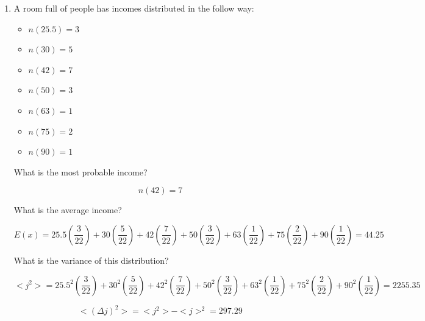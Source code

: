 \documentclass{article}
\begin{document}
\begin{enumerate}
\item A room full of people has incomes distributed in the follow way:

\begin{itemize}
\item $n(25.5) = 3$
\item $n(30) = 5$
\item $n(42) = 7$
\item $n(50) = 3$
\item $n(63) = 1$
\item $n(75) = 2$
\item $n(90) = 1$
\end{itemize}

What is the most probable income?

\[ n(42) = 7\]

What is the average income?

\[E(x) = 25.5 (\frac{3}{22})+ 30 (\frac{5}{22})+ 42 (\frac{7}{22})+ 50 (\frac{3}{22})+ 63 (\frac{1}{22})+ 75 (\frac{2}{22})+ 90 (\frac{1}{22})= 44.25\] 

What is the variance of this distribution?

\[<j^2> = 25.5^2 (\frac{3}{22})+ 30^2 (\frac{5}{22})+ 42^2 (\frac{7}{22})+ 50^2 (\frac{3}{22})+ 63^2 (\frac{1}{22})+ 75^2 (\frac{2}{22})+ 90^2 (\frac{1}{22})= 2255.35\]

\[ <(\Delta j)^2> = <j^2> - <j>^2 = 297.29 \]
\end{enumerate}









\end{document}
